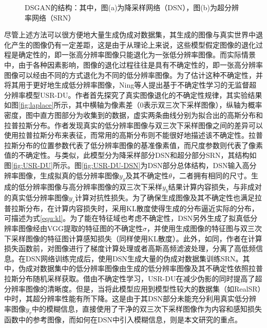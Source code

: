 \begin{figure}[htbp]
    \hfill
    \caption{DSGAN的结构：其中，图(a)为降采样网络（DSN），图(b)为超分辨率网络（SRN）}	
    \label{fig:DSGAN}
\end{figure}

尽管上述方法可以很方便地大量生成伪成对数据集，其生成的图像与真实世界中退化产生的图像仍有一定差距，这是由于从理论上来说，这些模型假定图像的退化过程是确定性的，即一张高分辨率图像只能退化为一张低分辨率图像。而实际情景中，由于各种因素影响，图像的退化过程往往是具有不确定性的，即一张高分辨率图像可以经由不同的方式退化为不同的低分辨率图像。为了估计这种不确定性，并将其用于更好地生成低分辨率图像，Ning等人\parencite{ijcai2022p176}提出基于不确定性学习的无监督超分辨率模型USR-DU。作者首先探究了真实图像退化的不确定性规律，其实验结果如图\ref{fig:laplace}所示，其中横轴为像素差（0表示双三次下采样图像），纵轴为概率密度，图中直方图部分为收集到的数据，虚实两条曲线分别为拟合出的高斯分布和拉普拉斯分布。作者发现真实的低分辨率图像与双三次下采样图像之间的差异可以使用拉普拉斯分布来表征，而常用的高斯分布则不能很好地描述该不确定性。拉普拉斯分布的位置参数代表了低分辨率图像的基准像素值，而尺度参数则代表了像素值的不确定性。与\parencite{fritsche2019frequency}类似，此模型分为降采样部分DSN和超分部分SRN，其结构如图\ref{fig:USR-DU}所示。图\ref{fig:USR-DU-DSN}为DSN部分总体结构，DSN输入高分辨率图像，生成拟真的低分辨率图像$y_g$及其不确定性$\theta$，二者拥有相同的尺寸。生成的低分辨率图像与高分辨率图像的双三次下采样$y_b$结果计算内容损失，与非成对的真实低分辨率图像$y_r$计算对抗性损失。为了确保生成图像及其不确定性也满足拉普拉斯分布，在计算内容损失时，采用KL散度使得生成的分布逼近实际的分布，可描述为式\ref{equ:kl}。为了能在特征域也考虑不确定性，DSN另外生成了拟真低分辨率图像经由VGG\parencite{simonyan2014very}提取的特征图的不确定性$\sigma$，并使用生成图像的特征图与双三次下采样图像的特征图计算感知损失（同样使用KL散度）。此外，如同\parencite{fritsche2019frequency}，作者在计算损失函数前，对图像进行了梯度计算处理或者高斯高频滤波处理，分离了高低频信息。在DSN网络训练完成后，使用DSN生成大量的伪成对数据集训练SRN。其中，伪成对数据集中的低分辨率图像由生成的低分辨率图像及其不确定性依照拉普拉斯分布随机采样获取。借由不确定性学习，USR-DU在减少伪影的同时提高了超分辨率图像的清晰度。但是，当将此模型应用到模型性较大的数据集（如RealSR）中时，其超分辨率性能有所下降。这是由于其DSN部分未能充分利用真实低分辨率图像$y_r$中的模糊信息，直接使用了干净的双三次下采样图像作为内容和感知损失函数中的参考图像，而如何在DSN中引入模糊信息，则是本文研究的重点。

